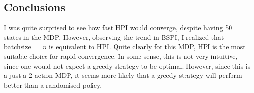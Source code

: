 \documentclass[11pt]{article}
\begin{document}
\subsection{Conclusions}
I was quite surprised to see how fast HPI would converge, despite having 50 states in the MDP. However, observing the trend in BSPI, I realized that batchsize $= n$ is equivalent to HPI. Quite clearly for this MDP, HPI is the most suitable choice for rapid convergence. In some sense, this is not very intuitive, since one would not expect a greedy strategy to be optimal. However, since this is a just a 2-action MDP, it seems more likely that a greedy strategy will perform better than a randomised policy.
\end{document}
